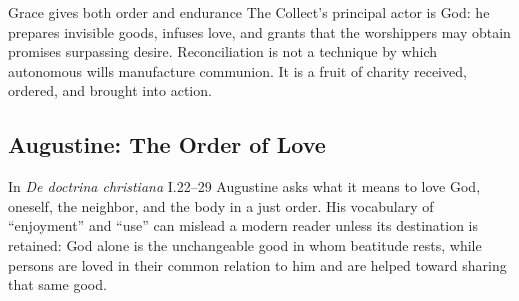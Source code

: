 \begin{deepstudy}
\begin{massbox}{Grace gives both order and endurance\enspace{}}
The Collect's principal actor is God: he prepares invisible goods, infuses love, and grants that the worshippers may obtain promises surpassing desire. Reconciliation is not a technique by which autonomous wills manufacture communion. It is a fruit of charity received, ordered, and brought into action.
\end{massbox}

\sectionguard
\subsection*{Augustine: The Order of Love\enspace{}}

In \emph{De doctrina christiana} I.22--29 Augustine asks what it means to love God, oneself, the neighbor, and the body in a just order. His vocabulary of ``enjoyment'' and ``use'' can mislead a modern reader unless its destination is retained: God alone is the unchangeable good in whom beatitude rests, while persons are loved in their common relation to him and are helped toward sharing that same good.


\end{deepstudy}
